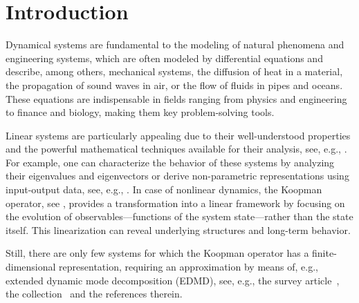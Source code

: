 \documentclass[preprint,12pt,authoryear]{elsarticle}
\begin{document}
\section{Introduction}


Dynamical systems are fundamental to the modeling of natural phenomena and engineering systems, which are often modeled by differential equations and describe, among others, mechanical systems, the diffusion of heat in a material, the propagation of sound waves in air, or the flow of fluids in pipes and oceans. 
These equations are indispensable in fields ranging from physics and engineering to finance and biology, making them key problem-solving tools.

Linear systems are particularly appealing due to their well-understood properties and the powerful mathematical techniques available for their analysis, see, e.g., \cite{trefethen2022numerical}. For example, one can characterize the behavior of these systems by analyzing their eigenvalues and eigenvectors or derive non-parametric representations using input-output data, see, e.g., \cite{willems2005note,van2020willems}. 
In case of nonlinear dynamics, the Koopman operator, see \cite{Koo31,RMB+09}, provides a transformation into a linear framework by focusing on the evolution of observables---functions of the system state---rather than the state itself. This linearization can reveal underlying structures and long-term behavior. 

Still, there are only few systems for which the Koopman operator has a finite-dimensional representation, requiring an approximation by means of, e.g., extended dynamic mode decomposition (EDMD), see, e.g., the survey article~\cite{brunton2022modern}, the collection~\cite{mauroy2020koopman} and the references therein.
\end{document}
